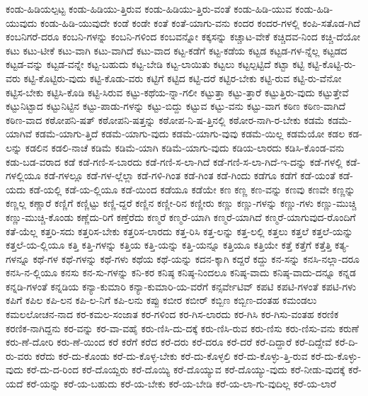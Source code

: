 {ಕಂಡು-ಹಿಡಿಯಲ್ಪಟ್ಟ
ಕಂಡು-ಹಿಡಿಯು-ತ್ತಿರುವ
ಕಂಡು-ಹಿಡಿಯು-ತ್ತಿರು-ವಂತೆ
ಕಂಡು-ಹಿಡಿ-ಯುವ
ಕಂಡು-ಹಿಡಿ-ಯುವುದು
ಕಂಡು-ಹಿಡಿ-ಯುವುದೇ
ಕಂಡೆ
ಕಂಡೇ
ಕಂತೆ
ಕಂತೆ-ಯಾಗು-ವನು
ಕಂದರ
ಕಂದರ-ಗಳಲ್ಲಿ
ಕಂಪಿ-ಸತೊಡ-ಗಿದೆ
ಕಂಬನಿಗರೆ-ದರೂ
ಕಂಬನಿ-ಗಳನ್ನು
ಕಂಬನಿ-ಗಳಿಂದ
ಕಂಬವನ್ನೋ
ಕಕ್ಕಸನ್ನು
ಕಚ್ಚಾಟ-ವೇಕೆ
ಕಚ್ಚಿದವ-ನಿಂದ
ಕಚ್ಚಿ-ದೆಯೋ
ಕಟು
ಕಟು-ಟೀಕೆ
ಕಟು-ವಾಗಿ
ಕಟು-ವಾಗಿದೆ
ಕಟು-ವಾದ
ಕಟ್ಟ-ಕಡೆಗೆ
ಕಟ್ಟ-ಕಡೆಯ
ಕಟ್ಟಡ
ಕಟ್ಟಡ-ಗಳ-ನ್ನೆಲ್ಲ
ಕಟ್ಟಡದ
ಕಟ್ಟಡ-ವನ್ನು
ಕಟ್ಟಡ-ವನ್ನೇ
ಕಟ್ಟ-ಬಹುದು
ಕಟ್ಟ-ಬೇಡಿ
ಕಟ್ಟ-ಲಾಯಿತು
ಕಟ್ಟಲು
ಕಟ್ಟಲ್ಪಟ್ಟಿದೆ
ಕಟ್ಟಾ
ಕಟ್ಟಿ
ಕಟ್ಟಿ-ಕೊಟ್ಟಿ-ರು-ವರು
ಕಟ್ಟಿ-ಕೊಟ್ಟಿರು-ವುದು
ಕಟ್ಟಿ-ಕೊಡು-ವರು
ಕಟ್ಟಿಗೆ
ಕಟ್ಟಿದ
ಕಟ್ಟಿ-ದರೆ
ಕಟ್ಟಿರ-ಬೇಕು
ಕಟ್ಟಿ-ರುವ
ಕಟ್ಟಿ-ರು-ವೆನೋ
ಕಟ್ಟಿಸ-ಬೇಕು
ಕಟ್ಟಿಸಿ-ಕೊಡಿ
ಕಟ್ಟಿ-ಸಿರುವ
ಕಟ್ಟು-ಕಥೆಯ-ನ್ನಾ-ಗಲೀ
ಕಟ್ಟುತ್ತಾ
ಕಟ್ಟು-ತ್ತಾರೆ
ಕಟ್ಟುತ್ತಿರು-ವುದು
ಕಟ್ಟುತ್ತೇವೆ
ಕಟ್ಟುನಿಟ್ಟಾದ
ಕಟ್ಟುನಿಟ್ಟಿನ
ಕಟ್ಟು-ಪಾಡು-ಗಳನ್ನು
ಕಟ್ಟು-ಬಿದ್ದು
ಕಟ್ಟುವ
ಕಟ್ಟು-ವನು
ಕಟ್ಟು-ವಾಗ
ಕಠಿಣ
ಕಠಿಣ-ವಾಗಿದೆ
ಕಠಿಣ-ವಾದ
ಕಠೋಪನಿ-ಷತ್
ಕಠೋಪನಿ-ಷತ್ತನ್ನು
ಕಠೋಪ-ನಿ-ಷ-ತ್ತಿನಲ್ಲಿ
ಕಠೋರ-ನಾಗಿ-ರ-ಬೇಕು
ಕಡಮೆ
ಕಡಮೆ-ಯಾಗಿವೆ
ಕಡಮೆ-ಯಾಗು-ತ್ತಿದೆ
ಕಡಮೆ-ಯಾಗು-ವುದು
ಕಡಮೆ-ಯಾಗು-ವುವು
ಕಡಮೆ-ಯಿಲ್ಲ
ಕಡಮೆಯೋ
ಕಡಲ
ಕಡ-ಲನ್ನು
ಕಡಲಿನ
ಕಡಲಿ-ನಾಚೆ
ಕಡಿಮೆ
ಕಡಿಮೆ-ಯಾಗಿ
ಕಡಿಮೆ-ಯಾಗು-ವುದು
ಕಡಿಯ-ಲಾರದು
ಕಡಿಸಿ-ಕೊಂಡ-ವನು
ಕಡು-ಬಡ-ವರಾದ
ಕಡೆ
ಕಡೆ-ಗಣಿ-ಸ-ಬಾರದು
ಕಡೆ-ಗಣಿ-ಸ-ಲಾ-ಗಿದೆ
ಕಡೆ-ಗಣಿ-ಸ-ಲಾ-ಗಿದೆ-ಇ-ದನ್ನು
ಕಡೆ-ಗಳಲ್ಲಿ
ಕಡೆ-ಗಳಲ್ಲಿಯೂ
ಕಡೆ-ಗಳಲ್ಲೂ
ಕಡೆ-ಗಳ-ಲ್ಲೆಲ್ಲಾ
ಕಡೆ-ಗಳಿ-ಗಿಂತ
ಕಡೆ-ಗಿಂತ
ಕಡೆ-ಗಿಂದು
ಕಡೆಗೂ
ಕಡೆಗೆ
ಕಡೆ-ಯಂತೆ
ಕಡೆ-ಯದು
ಕಡೆ-ಯಲ್ಲಿ
ಕಡೆ-ಯ-ಲ್ಲಿಯೂ
ಕಡೆ-ಯಿಂದ
ಕಡೆಯೂ
ಕಡೆಯೇ
ಕಣ
ಕಣ್ಣ
ಕಣ-ವನ್ನು
ಕಣವು
ಕಣವೇ
ಕಣ್ಣನ್ನು
ಕಣ್ಣಲ್ಲ
ಕಣ್ಣಾರೆ
ಕಣ್ಣಿಗೆ
ಕಣ್ಣಿಟ್ಟು
ಕಣ್ಣಿ-ದ್ದರೆ
ಕಣ್ಣಿನ
ಕಣ್ಣೀ-ರಿನ
ಕಣ್ಣೀರು
ಕಣ್ಣು
ಕಣ್ಣು-ಗಳನ್ನು
ಕಣ್ಣು-ಗಳು
ಕಣ್ಣು-ಮುಚ್ಚಿ
ಕಣ್ಣು-ಮುಚ್ಚಿ-ಕೊಂಡು
ಕಣ್ಣೆದು-ರಿಗೆ
ಕಣ್ತೆರೆದು
ಕಣ್ಮರೆ
ಕಣ್ಮರೆ-ಯಾಗಿ
ಕಣ್ಮರೆ-ಯಾಗಿದೆ
ಕಣ್ಮರೆ-ಯಾಗುವುದ-ರೊಂದಿಗೆ
ಕತೆ-ಯೆಲ್ಲ
ಕತ್ತರಿ-ಸದು
ಕತ್ತರಿಸ-ಬೇಕು
ಕತ್ತರಿಸ-ಲಾರದು
ಕತ್ತ-ರಿಸಿ
ಕತ್ತ-ಲನ್ನು
ಕತ್ತ-ಲಲ್ಲಿ
ಕತ್ತಲು
ಕತ್ತಲೆ
ಕತ್ತಲೆ-ಯನ್ನು
ಕತ್ತಲೆ-ಯ-ಲ್ಲಿಯೂ
ಕತ್ತಿ
ಕತ್ತಿ-ಗಳನ್ನು
ಕತ್ತಿಯ
ಕತ್ತಿ-ಯನ್ನು
ಕತ್ತಿ-ಯನ್ನೂ
ಕತ್ತಿಯೂ
ಕತ್ತಿಯೇ
ಕತ್ತೆ
ಕತ್ತೆಗೆ
ಕತ್ತೆತ್ತಿ
ಕತ್ಯ-ಗಳನ್ನೂ
ಕಥೆ-ಗಳ
ಕಥೆ-ಗಳನ್ನು
ಕಥೆ-ಗಳು
ಕಥೆಯ
ಕಥೆ-ಯನ್ನು
ಕದನ-ಕ್ಕಾಗಿ
ಕದ್ದರೆ
ಕದ್ದು
ಕನ-ಸನ್ನು
ಕನಸಿ-ನಲ್ಲಾ-ದರೂ
ಕನಸಿ-ನ-ಲ್ಲಿಯೂ
ಕನಸು
ಕನ-ಸು-ಗಳನ್ನು
ಕನಿ-ಕರ
ಕನಿಷ್ಠ
ಕನಿಷ್ಠ-ನಿಂದಲೂ
ಕನಿಷ್ಠ-ವಾದು
ಕನಿಷ್ಠ-ವಾದು-ದನ್ನೂ
ಕನ್ನಡ
ಕನ್ನಡಿ-ಗಳಂತೆ
ಕನ್ನಡಿಯ
ಕನ್ಯಾ-ಕುಮಾರಿ
ಕನ್ಯಾ-ಕುಮಾರಿ-ಯ-ವರೆಗೆ
ಕನ್ಸರ್ವೇಟಿವ್
ಕಪಟಿ
ಕಪಟಿ-ಗಳಂತೆ
ಕಪಟಿ-ಗಳು
ಕಪಿಗೆ
ಕಪಿಲ
ಕಪಿ-ಲನ
ಕಪಿ-ಲ-ನಿಗೆ
ಕಪಿ-ಲನು
ಕಪ್ಪು
ಕಬೀರ
ಕಬೀರ್
ಕಬ್ಬಿಣ
ಕಬ್ಬಿಣ-ದಂತಹ
ಕಮಂಡಲು
ಕಮಲಲೋಚನ-ನಾದ
ಕರ-ಕಮಲ-ಸಂಜಾತ
ಕರ-ಗಳಿಂದ
ಕರ-ಗಿಸ-ಲಾರದು
ಕರ-ಗಿಸಿ
ಕರ-ಗಿಸು-ವಂತಹ
ಕರಣಿಕ
ಕರಣಿಕ-ನಾಗಿದ್ದನು
ಕರ-ವನ್ನು
ಕರ-ವಾ-ವಹೈ
ಕರು-ಣಿಸಿ-ದು-ದಕ್ಕೆ
ಕರು-ಣಿಸಿ-ರುವ
ಕರು-ಣಿಸು
ಕರು-ಣಿಸು-ವನು
ಕರುಣೆ
ಕರು-ಣೆ-ದೋರಿ
ಕರು-ಣೆ-ಯಿಂದ
ಕರೆ
ಕರೆಗೆ
ಕರೆದ
ಕರೆ-ದರು
ಕರೆ-ದರೂ
ಕರೆ-ದರೆ
ಕರೆ-ದಿದ್ದಾರೆ
ಕರೆ-ದಿದ್ದೇವೆ
ಕರೆ-ದಿ-ರು-ವರು
ಕರೆದು
ಕರೆ-ದು-ಕೊಂಡು
ಕರೆ-ದು-ಕೊಳ್ಳ-ಬೇಕು
ಕರೆ-ದು-ಕೊಳ್ಳಲಿ
ಕರೆ-ದು-ಕೊಳ್ಳು-ತ್ತಿ-ರುವ
ಕರೆ-ದು-ಕೊಳ್ಳು-ವುದು
ಕರೆ-ದು-ದ-ರಿಂದ
ಕರೆ-ದೊಯ್ದರು
ಕರೆ-ದೊಯ್ಯಿ
ಕರೆ-ದೊಯ್ಯುವ
ಕರೆ-ದೊಯ್ಯು-ವುದು
ಕರೆ-ನೀಡು-ವುದಕ್ಕೆ
ಕರೆ-ಯದೆ
ಕರೆ-ಯನ್ನು
ಕರೆ-ಯ-ಬಹುದು
ಕರೆ-ಯ-ಬೇಕು
ಕರೆ-ಯ-ಬೇಡಿ
ಕರೆ-ಯ-ಲಾ-ಗು-ವುದಿಲ್ಲ
ಕರೆ-ಯ-ಲಾರೆ
}
